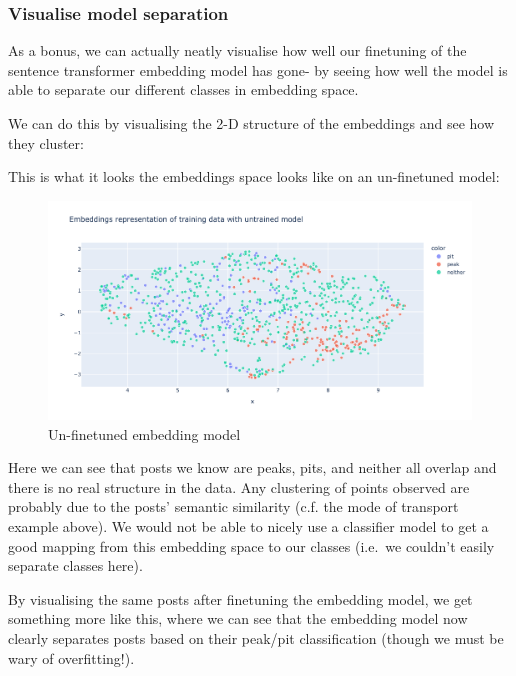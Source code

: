 \documentclass[
  letterpaper,
  DIV=11,
  numbers=noendperiod]{scrreprt}
\begin{document}
\subsubsection*{Visualise model
separation}\label{visualise-model-separation}

As a bonus, we can actually neatly visualise how well our finetuning of
the sentence transformer embedding model has gone- by seeing how well
the model is able to separate our different classes in embedding space.

We can do this by visualising the 2-D structure of the embeddings and
see how they cluster:

This is what it looks the embeddings space looks like on an un-finetuned
model:

\begin{figure}[H]

{\centering \includegraphics{./img/embedding_untrained.png}

}

\caption{Un-finetuned embedding model}

\end{figure}%

Here we can see that posts we know are peaks, pits, and neither all
overlap and there is no real structure in the data. Any clustering of
points observed are probably due to the posts' semantic similarity (c.f.
the mode of transport example above). We would not be able to nicely use
a classifier model to get a good mapping from this embedding space to
our classes (i.e.~we couldn't easily separate classes here).

By visualising the same posts after finetuning the embedding model, we
get something more like this, where we can see that the embedding model
now clearly separates posts based on their peak/pit classification
(though we must be wary of overfitting!).
\end{document}
